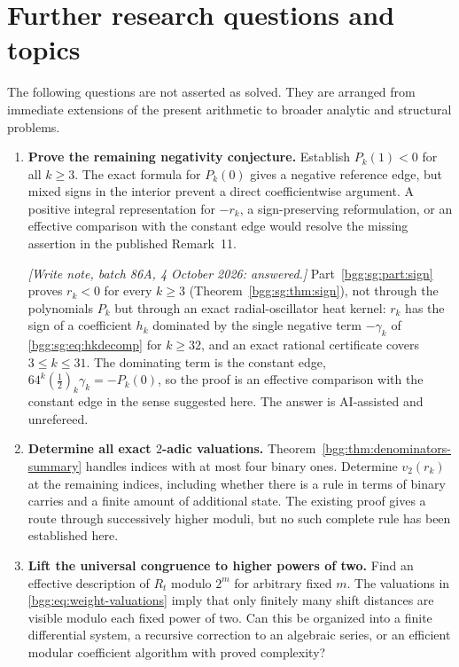 \documentclass[11pt,a4paper]{article}
\numberwithin{equation}{section}
\theoremstyle{definition}
\theoremstyle{remark}
\theoremstyle{definition}
\begin{document}
\section{Further research questions and topics}
\label{bgg:sec:future}

The following questions are not asserted as solved. They are arranged from
immediate extensions of the present arithmetic to broader analytic and
structural problems.

\begin{enumerate}[label=\textbf{\arabic*.}]
\item \textbf{Prove the remaining negativity conjecture.}
Establish $P_k(1)<0$ for all $k\ge3$. The exact formula for $P_k(0)$ gives a
negative reference edge, but mixed signs in the interior prevent a direct
coefficientwise argument. A positive integral representation for $-r_k$, a
sign-preserving reformulation, or an effective comparison with the constant
edge would resolve the missing assertion in the published Remark~11.

\emph{[Write note, batch 86A, 4 October 2026: answered.]} Part~\ref{bgg:sg:part:sign}
proves $r_k<0$ for every $k\ge3$ (Theorem~\ref{bgg:sg:thm:sign}),
not through the polynomials $P_k$ but through an exact radial-oscillator
heat kernel: $r_k$ has the sign of a coefficient $h_k$ dominated by the
single negative term $-\gamma_k$ of \eqref{bgg:sg:eq:hkdecomp} for
$k\ge32$, and an exact rational
certificate covers $3\le k\le31$. The dominating term is the constant
edge, $64^k(\tfrac12)_k\gamma_k=-P_k(0)$, so the proof is an effective
comparison with the constant edge in the sense suggested here.
The answer is AI-assisted and unrefereed.

\item \textbf{Determine all exact $2$-adic valuations.}
Theorem~\ref{bgg:thm:denominators-summary} handles indices with at most four
binary ones. Determine $v_2(r_k)$ at the remaining indices, including whether
there is a rule in terms of binary carries and a finite amount of additional
state. The existing proof gives a route through successively higher
moduli, but no such complete rule has been established here.

\item \textbf{Lift the universal congruence to higher powers of two.}
Find an effective description of $R_t$ modulo $2^m$ for arbitrary fixed $m$.
The valuations in \eqref{bgg:eq:weight-valuations} imply that only finitely many
shift distances are visible modulo each fixed power of two. Can this be
organized into a finite differential system, a recursive correction to an
algebraic series, or an efficient modular coefficient algorithm with proved
complexity?


\end{enumerate}
\end{document}
